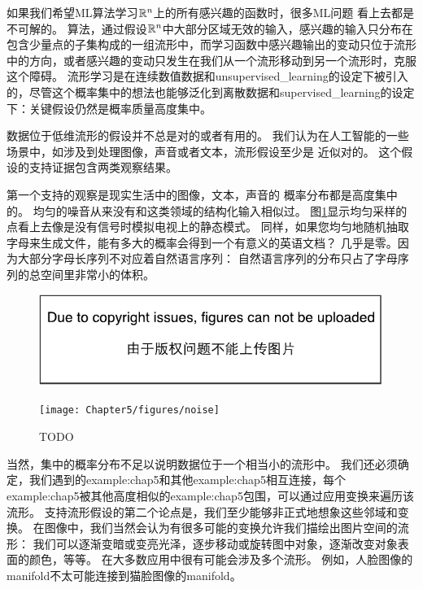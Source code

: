如果我们希望\gls{ML}算法学习$\mathbb{R}^n$上的所有感兴趣的函数时，很多\gls{ML}问题
看上去都是不可解的。
算法，通过假设$\mathbb{R}^n$中大部分区域无效的输入，感兴趣的输入只分布在包含少量点的子集构成的一组流形中，而学习函数中感兴趣输出的变动只位于流形中的方向，或者感兴趣的变动只发生在我们从一个流形移动到另一个流形时，克服这个障碍。
流形学习是在连续数值数据和\gls{unsupervised_learning}的设定下被引入的，尽管这个概率集中的想法也能够泛化到离散数据和\gls{supervised_learning}的设定下：关键假设仍然是概率质量高度集中。


数据位于低维流形的假设并不总是对的或者有用的。
我们认为在人工智能的一些场景中，如涉及到处理图像，声音或者文本，流形假设至少是
近似对的。
这个假设的支持证据包含两类观察结果。

第一个支持的观察是现实生活中的图像，文本，声音的
概率分布都是高度集中的。
均匀的噪音从来没有和这类领域的结构化输入相似过。
图\ref{fig:chap5_noise}显示均匀采样的点看上去像是没有信号时模拟电视上的静态模式。
同样，如果您均匀地随机抽取字母来生成文件，能有多大的概率会得到一个有意义的英语文档？
几乎是零。因为大部分字母长序列不对应着自然语言序列：
自然语言序列的分布只占了字母序列的总空间里非常小的体积。

\begin{figure}[!htb]
\ifOpenSource
\centerline{\includegraphics{figure.pdf}}
\else
\centerline{\texttt{[image: Chapter5/figures/noise]}}
\fi
\caption{TODO}
\label{fig:chap5_noise}
\end{figure}

当然，集中的概率分布不足以说明数据位于一个相当小的流形中。
我们还必须确定，我们遇到的\gls{example:chap5}和其他\gls{example:chap5}相互连接，每个\gls{example:chap5}被其他高度相似的\gls{example:chap5}包围，可以通过应用变换来遍历该流形。
支持流形假设的第二个论点是，我们至少能够非正式地想象这些邻域和变换。
在图像中，我们当然会认为有很多可能的变换允许我们描绘出图片空间的流形：
我们可以逐渐变暗或变亮光泽，逐步移动或旋转图中对象，逐渐改变对象表面的颜色，等等。
在大多数应用中很有可能会涉及多个流形。
例如，人脸图像的\gls{manifold}不太可能连接到猫脸图像的\gls{manifold}。

